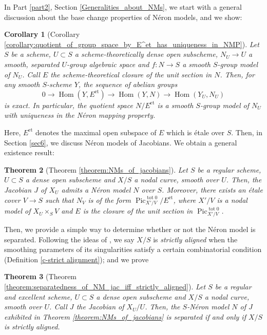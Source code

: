 \documentclass[a4paper,10pt,twoside]{article}
\newcommand{\on}[1]{\operatorname{#1}}
\DeclareMathOperator{\pic}{Pic}
\DeclareMathOperator{\Hom}{Hom}
\newtheorem{thm}{Theorem}[section]
\newtheorem{cor}[thm]{Corollary}
\theoremstyle{definition}
\theoremstyle{remark}
\renewcommand{\on}[1]{\operatorname{#1}}
\begin{document}
In Part \ref{part2}, Section \ref{Generalities_about_NMs}, we start with a general discussion about the base change properties of Néron models, and we show:

\begin{cor}[Corollary \ref{corollary:quotient_of_group_space_by_E^et_has_uniqueness_in_NMP}]
Let $S$ be a scheme, $U\subset S$ a scheme-theoretically dense open subscheme, $N_U \to U$ a smooth, separated $U$-group algebraic space and $f\colon N \to S$ a smooth $S$-group model of $N_U$. Call $E$ the scheme-theoretical closure of the unit section in $N$. Then, for any smooth $S$-scheme $Y$, the sequence of abelian groups
\[
0 \to \Hom(Y,E^{\on{et}}) \to \Hom(Y,N) \to \Hom(Y_U,N_U)
\]
is exact. In particular, the quotient space $N/E^{\on{et}}$ is a smooth $S$-group model of $N_U$ with uniqueness in the Néron mapping property.
\end{cor}

Here, $E^{\on{et}}$ denotes the maximal open subspace of $E$ which is étale over $S$. Then, in Section \ref{sec6}, we discuss Néron models of Jacobians. We obtain a general existence result:

\begin{thm}[Theorem \ref{theorem:NMs_of_jacobians}]
Let $S$ be a regular scheme, $U\subset S$ a dense open subscheme and $X/S$ a nodal curve, smooth over $U$. Then, the Jacobian $J$ of $X_U$ admits a Néron model $N$ over $S$. Moreover, there exists an étale cover $V \to S$ such that $N_V$ is of the form $\pic^{\on{tot}0}_{X'/V}/E^{\on{et}}$, where $X'/V$ is a nodal model of $X_U\times_S V$ and $E$ is the closure of the unit section in $\pic^{\on{tot}0}_{X'/V}$.
\end{thm}

Then, we provide a simple way to determine whether or not the Néron model is separated. Following the ideas of \cite{Holmes}, we say $X/S$ is \emph{strictly aligned} when the smoothing parameters of its singularities satisfy a certain combinatorial condition (Definition \ref{c-strict alignment}); and we prove

\begin{thm}[Theorem \ref{theorem:separatedness_of_NM_jac_iff_strictly_aligned}]
Let $S$ be a regular and excellent scheme, $U\subset S$ a dense open subscheme and $X/S$ a nodal curve, smooth over $U$. Call $J$ the Jacobian of $X_U/U$. Then, the $S$-Néron model $N$ of $J$ exhibited in Theorem \ref{theorem:NMs_of_jacobians} is separated if and only if $X/S$ is strictly aligned.
\end{thm}
\end{document}
